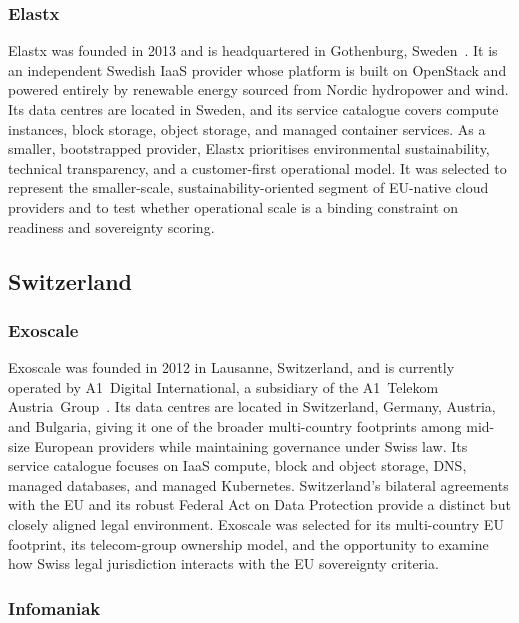 \subsubsection{Elastx}

Elastx was founded in 2013 and is headquartered in Gothenburg, Sweden~\cite{Elastx_About}. It is an independent Swedish IaaS provider whose platform is built on OpenStack and powered entirely by renewable energy sourced from Nordic hydropower and wind. Its data centres are located in Sweden, and its service catalogue covers compute instances, block storage, object storage, and managed container services. As a smaller, bootstrapped provider, Elastx prioritises environmental sustainability, technical transparency, and a customer-first operational model. It was selected to represent the smaller-scale, sustainability-oriented segment of EU-native cloud providers and to test whether operational scale is a binding constraint on readiness and sovereignty scoring.

\subsection{Switzerland}

\subsubsection{Exoscale}

Exoscale was founded in 2012 in Lausanne, Switzerland, and is currently operated by A1~Digital International, a subsidiary of the A1~Telekom Austria~Group~\cite{Exoscale_About}. Its data centres are located in Switzerland, Germany, Austria, and Bulgaria, giving it one of the broader multi-country footprints among mid-size European providers while maintaining governance under Swiss law. Its service catalogue focuses on IaaS compute, block and object storage, DNS, managed databases, and managed Kubernetes. Switzerland's bilateral agreements with the EU and its robust Federal Act on Data Protection provide a distinct but closely aligned legal environment. Exoscale was selected for its multi-country EU footprint, its telecom-group ownership model, and the opportunity to examine how Swiss legal jurisdiction interacts with the EU sovereignty criteria.

\subsubsection{Infomaniak}

